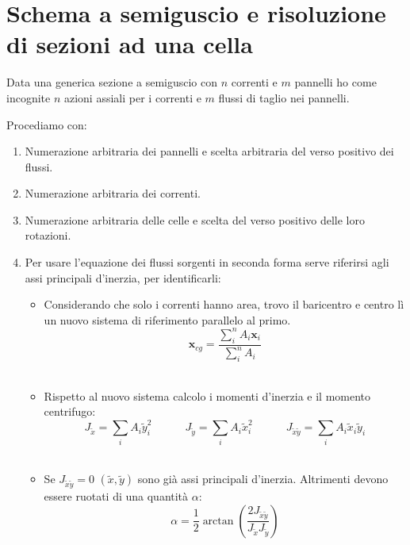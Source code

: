 \section{Schema a semiguscio e risoluzione di sezioni ad una cella}


Data una generica sezione a semiguscio con $n$ correnti e $m $ pannelli ho come incognite $n$ azioni assiali per i correnti e $m$ flussi di taglio nei pannelli.

Procediamo con:
\begin{enumerate}
    \item Numerazione arbitraria dei pannelli e scelta arbitraria del verso positivo dei flussi.\\
    \item Numerazione arbitraria dei correnti.\\
    \item Numerazione arbitraria delle celle e scelta del verso positivo delle loro rotazioni.\\
    \item Per usare l'equazione dei flussi sorgenti in seconda forma serve riferirsi agli assi principali d'inerzia, per identificarli:
    \begin{itemize}
        \item Considerando che solo i correnti hanno area, trovo il baricentro e centro lì un nuovo sistema di riferimento parallelo al primo.
            \begin{equation*}
                \boldsymbol{x}_{cg}=\frac{\sum_i^nA_i\boldsymbol{x}_i}{\sum_i^nA_i}
            \end{equation*}\\
        \item Rispetto al nuovo sistema calcolo i momenti d'inerzia e il momento centrifugo:
    \begin{equation*}
     J_{\tilde{x}} = \sum_i A_i \tilde{y}_i^2 \quad\quad\quad
     J_{\tilde{y}} = \sum_i A_i \tilde{x}_i^2 \quad\quad\quad
     J_{\tilde{x}\tilde{y}} = \sum_i A_i \tilde{x}_i \tilde{y}_i
    \end{equation*}\\
    \item Se $ J_{\tilde{x}\tilde{y}} = 0$ $(\tilde{x},\tilde{y})$ sono già assi principali d'inerzia. Altrimenti devono essere ruotati di una quantità $\alpha$:
    \begin{equation*}
        \alpha = \frac{1}{2} \arctan\left(\frac{2 J_{\tilde{x}\tilde{y}} }{J_{\tilde{x}} J_{\tilde{y}} }\right)
    \end{equation*}\\

\end{itemize}
\end{enumerate}

